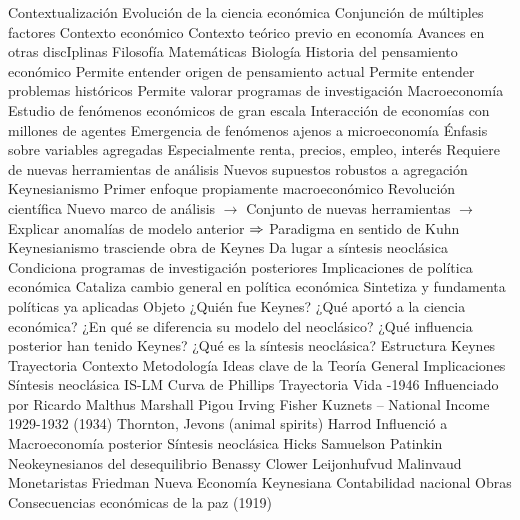 \documentclass{nuevotema}
\begin{document}
\begin{esquemal}
	\1[] 
		\2 Contextualización
			\3 Evolución de la ciencia económica
				\4 Conjunción de múltiples factores
				\4 Contexto económico
				\4 Contexto teórico previo en economía
				\4 Avances en otras discIplinas
				\4[] Filosofía
				\4[] Matemáticas
				\4[] Biología
			\3 Historia del pensamiento económico
				\4 Permite entender origen de pensamiento actual
				\4 Permite entender problemas históricos
				\4 Permite valorar programas de investigación
			\3 Macroeconomía
				\4 Estudio de fenómenos económicos de gran escala
				\4[] Interacción de economías con millones de agentes
				\4[] Emergencia de fenómenos ajenos a microeconomía
				\4 Énfasis sobre variables agregadas
				\4[] Especialmente renta, precios, empleo, interés
				\4[] Requiere de nuevas herramientas de análisis
				\4[] Nuevos supuestos robustos a agregación
			\3 Keynesianismo
				\4 Primer enfoque propiamente macroeconómico
				\4 Revolución científica
				\4[] Nuevo marco de análisis
				\4[] $\to$ Conjunto de nuevas herramientas
				\4[] $\to$ Explicar anomalías de modelo anterior
				\4[] $\Rightarrow$ Paradigma en sentido de Kuhn
				\4 Keynesianismo trasciende obra de Keynes
				\4[] Da lugar a síntesis neoclásica
				\4[] Condiciona programas de investigación posteriores
				\4 Implicaciones de política económica
				\4[] Cataliza cambio general en política económica
				\4[] Sintetiza y fundamenta políticas ya aplicadas
		\2 Objeto
			\3 ¿Quién fue Keynes?
			\3 ¿Qué aportó a la ciencia económica?
			\3 ¿En qué se diferencia su modelo del neoclásico?
			\3 ¿Qué influencia posterior han tenido Keynes?
			\3 ¿Qué es la síntesis neoclásica?
		\2 Estructura
			\3 Keynes
				\4 Trayectoria
				\4 Contexto
				\4 Metodología
				\4 Ideas clave de la Teoría General
				\4 Implicaciones
			\3 Síntesis neoclásica
				\4 IS-LM
				\4 Curva de Phillips
	\1 
		\2 Trayectoria
			\3 Vida
				-1946
			\3 Influenciado por
				\4 Ricardo
				\4 Malthus
				\4 Marshall
				\4 Pigou
				\4 Irving Fisher
				\4 Kuznets -- National Income 1929-1932 (1934)
				\4 Thornton, Jevons (animal spirits)
				\4 Harrod
			\3 Influenció a
				\4 Macroeconomía posterior
				\4 Síntesis neoclásica
				\4[] Hicks
				\4[] Samuelson
				\4[] Patinkin
				\4 Neokeynesianos del desequilibrio
				\4[] Benassy
				\4[] Clower
				\4[] Leijonhufvud
				\4[] Malinvaud
				\4 Monetaristas
				\4[] Friedman
				\4 Nueva Economía Keynesiana
				\4 Contabilidad nacional
			\3 Obras
				\4 Consecuencias económicas de la paz (1919)

\end{esquemal}
\end{document}
